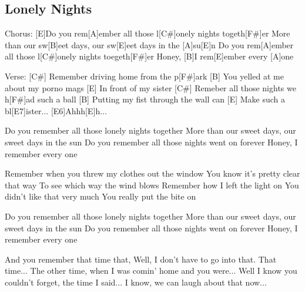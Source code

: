 \subsection*{Lonely Nights   }
\begin{guitar}
Chorus:
{}[E]Do you rem[A]ember all those l[C#]onely nights togeth[F#]er
More than our sw[B]eet days, our sw[E]eet days in the [A]su[E]n
Do you rem[A]ember all those l[C#]onely nights toegeth[F#]er
Honey, [B]I rem[E]ember every [A]one


Verse:
{}[C#]   Remember driving home from the p[F#]ark
{}[B]  You yelled at me about my porno mags
{}[E]  In front of my sister
{}[C#]   Remeber all those nights we h[F#]ad such a ball
{}[B]  Putting my fist through the wall can
{}[E]  Make such a bl[E7]ister... [E6]Ahhh[E]h...



Do you remember all those lonely nights together
More than our sweet days, our sweet days in the sun
Do you remember all those nights went on forever
Honey, I remember every one



Remember when you threw my clothes out the window
You know it's pretty clear that way
To see which way the wind blows
Remember how I left the light on
You didn't like that very much
You really put the bite on



Do you remember all those lonely nights together
More than our sweet days, our sweet days in the sun
Do you remember all those nights went on forever
Honey, I remember every one



And you remember that time that,
Well, I don't have to go into that. That time...
The other time, when I was comin' home and you were...
Well I know you couldn't forget, the time I said...
I know, we can laugh about that now...
\end{guitar}
